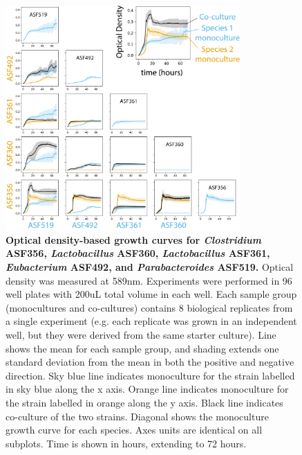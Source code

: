 \documentclass[11pt,twocolumn,notitlepage,openany,twoside]{book}
\begin{document}
\begin{refsection}
\begin{figure}
\centering
\includegraphics[width=0.8\textwidth]{ch2_figS2}
\caption[Optical density-based growth curves for \textit{Clostridium} ASF356, \textit{Lactobacillus} ASF360, \textit{Lactobacillus} ASF361, \textit{Eubacterium} ASF492, and \textit{Parabacteroides} ASF519.]{\textbf{Optical density-based growth curves for \textit{Clostridium} ASF356, \textit{Lactobacillus} ASF360, \textit{Lactobacillus} ASF361, \textit{Eubacterium} ASF492, and \textit{Parabacteroides} ASF519.} Optical density was measured at 589nm. Experiments were performed in 96 well plates with 200uL total volume in each well. Each sample group (monocultures and co-cultures) contains 8 biological replicates from a single experiment (e.g. each replicate was grown in an independent well, but they were derived from the same starter culture). Line shows the mean for each sample group, and shading extends one standard deviation from the mean in both the positive and negative direction. Sky blue line indicates monoculture for the strain labelled in sky blue along the x axis. Orange line indicates monoculture for the strain labelled in orange along the y axis. Black line indicates co-culture of the two strains. Diagonal shows the monoculture growth curve for each species. Axes units are identical on all subplots. Time is shown in hours, extending to 72 hours.}
\end{figure}

\end{refsection}


\end{document}
